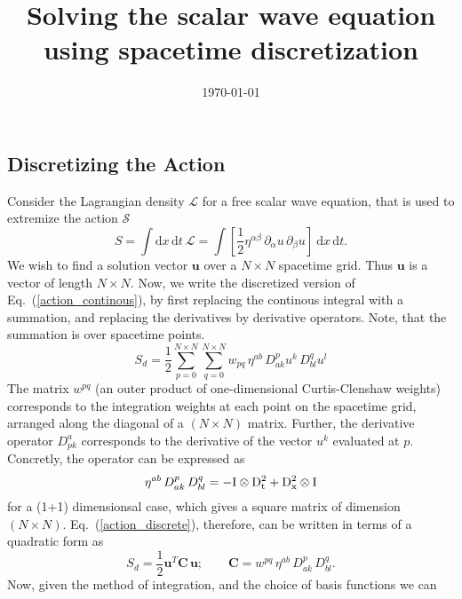 \documentclass[nofootinbib,preprintnumbers,superscriptaddress,notitlepage]{revtex4-1}
\newcommand{\<}{\begin{equation}}
\newcommand{\?}{\end{equation}}
\begin{document}
\title{Solving the scalar wave equation using spacetime discretization}
\date{\today}
\maketitle
\subsection{Discretizing the Action}
Consider the Lagrangian density $\mathcal{L}$ for a free scalar wave equation,
that is used to extremize the action $\mathcal{S}$
\begin{equation}
\label{action_continous}
S = \int \textrm{d}x\,\textrm{d}t~\mathcal{L} =  \int  \left[\dfrac{1}{2}
\eta^{\alpha \beta}\, \partial_{\alpha} u\, \partial_{\beta} u\right]~
\textrm{d}x\,\textrm{d}t.
\end{equation}
We wish to find a solution vector $\mathbf{u}$ over a $N\times N$ spacetime
grid. Thus $\mathbf{u}$ is a vector of length $N\times N$. Now, we write the
discretized version of Eq.~(\ref{action_continous}), by first replacing the
continous integral with a summation, and replacing the derivatives by
derivative operators. Note, that the summation is over spacetime points.
\begin{equation}
\label{action_discrete}
S_d = \dfrac{1}{2} \sum\limits_{p=0}^{N\times N}\sum\limits_{q=0}^{N\times N} w_{pq}\, \eta^{ab} \, D_{ak}^p u^{k}\, D_{bl}^q u^{l} 
\end{equation}
The matrix $w^{pq}$ (an outer product of one-dimensional Curtis-Clenshaw
weights) corresponds to the integration weights at each point on the spacetime
grid, arranged along the diagonal of a $(N\times N)$ matrix. Further, the
derivative operator $D^a_{pk}$ corresponds to the derivative of the vector
$u^k$ evaluated at $p$. Concretly, the operator can be expressed as
\begin{equation}
\eta^{ab} \, D_{ak}^p\, D_{bl}^q = - \rm{I}\otimes D_t^2 +  D_x^2\otimes\rm{I}
\end{equation}
for a (1+1) dimensionsal case, which gives a square matrix of dimension
$(N\times N)$. Eq.~(\ref{action_discrete}), therefore, can be written in terms
of a quadratic form as
\begin{equation}
S_d = \dfrac{1}{2} \mathbf{u}^T \mathbf{C}\, \mathbf{u}; \qquad \mathbf{C} = w^{pq}\, \eta^{ab} \, D_{ak}^p \, D_{bl}^q.
\end{equation}
Now, given the method of integration, and the choice of basis functions we can
\end{document}
